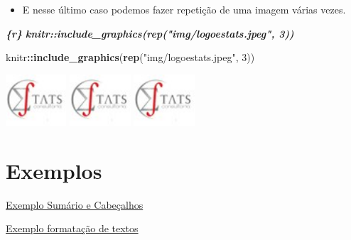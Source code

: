 \documentclass[
]{book}
\newenvironment{Shaded}{\begin{snugshade}}{\end{snugshade}}
\newcommand{\DecValTok}[1]{\textcolor[rgb]{0.00,0.00,0.81}{#1}}
\newcommand{\InformationTok}[1]{\textcolor[rgb]{0.56,0.35,0.01}{\textbf{\textit{#1}}}}
\newcommand{\KeywordTok}[1]{\textcolor[rgb]{0.13,0.29,0.53}{\textbf{#1}}}
\newcommand{\NormalTok}[1]{#1}
\newcommand{\OperatorTok}[1]{\textcolor[rgb]{0.81,0.36,0.00}{\textbf{#1}}}
\newcommand{\StringTok}[1]{\textcolor[rgb]{0.31,0.60,0.02}{#1}}
\providecommand{\tightlist}{%
  \setlength{\itemsep}{0pt}\setlength{\parskip}{0pt}}
\begin{document}
\begin{itemize}
\tightlist
\item
  E nesse último caso podemos fazer repetição de uma imagem várias vezes.
\end{itemize}

\begin{Shaded}
\begin{Highlighting}[]
\InformationTok{\textasciigrave{}\textasciigrave{}\textasciigrave{}\{r\}}
\InformationTok{knitr::include\_graphics(rep("img/logoestats.jpeg", 3))}
\InformationTok{\textasciigrave{}\textasciigrave{}\textasciigrave{}}
\end{Highlighting}
\end{Shaded}

\begin{Shaded}
\begin{Highlighting}[]
\NormalTok{knitr}\OperatorTok{::}\KeywordTok{include\_graphics}\NormalTok{(}\KeywordTok{rep}\NormalTok{(}\StringTok{"img/logoestats.jpeg"}\NormalTok{, }\DecValTok{3}\NormalTok{))}
\end{Highlighting}
\end{Shaded}

\includegraphics[width=0.89in]{img/logoestats}
\includegraphics[width=0.89in]{img/logoestats}
\includegraphics[width=0.89in]{img/logoestats}

\hypertarget{exemplos}{%
\section{Exemplos}\label{exemplos}}

\href{exemplos/102-sumario_e_cabecalho.html}{Exemplo Sumário e Cabeçalhos}

\href{exemplos/103-formatacao_de_texto.html}{Exemplo formatação de textos}
\end{document}
